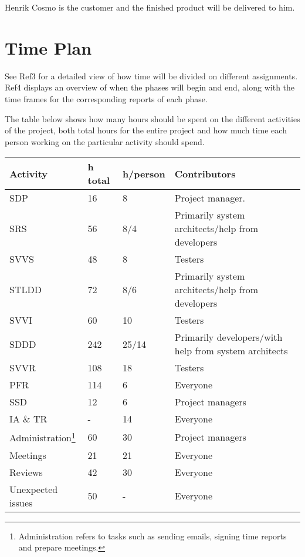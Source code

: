 \documentclass[a4paper]{article}
\begin{document}
Henrik Cosmo is the customer and the finished product will be delivered to him.

\section{Time Plan}
See Ref3 for a detailed view of how time will be divided on different assignments. Ref4 displays an overview of when the phases will begin and end, along with the time frames for the corresponding reports of each phase.

The table below shows how many hours should be spent on the different activities of the project, both total hours for the entire project and how much time each person working on the particular activity should spend.

\begin{center}
    \begin{tabular}{ | l | l | l | p{5cm} |}
    \hline
    \textbf{Activity} & \textbf{h total} & \textbf{h/person} & \textbf{Contributors} \\ \hline
    SDP & 16 & 8 & Project manager. \\ \hline
    SRS & 56 & 8/4 &  Primarily system architects/help from developers\\ \hline
    SVVS & 48 & 8 & Testers\\ \hline
    STLDD & 72 & 8/6 & Primarily system architects/help from developers\\ \hline
    SVVI & 60 & 10 & Testers\\ \hline
    SDDD & 242 & 25/14 & Primarily developers/with help from system architects\\ \hline
    SVVR & 108 & 18 & Testers\\ \hline
    PFR & 114 & 6 & Everyone\\ \hline
    SSD & 12 & 6 & Project managers\\ \hline
    IA \& TR & - & 14 & Everyone \\ \hline
    Administration\footnote{Administration refers to tasks such as sending emails, signing time reports and prepare meetings.} & 60 & 30 & Project managers \\ \hline
    Meetings & 21 & 21 & Everyone \\ \hline
    Reviews & 42 & 30 & Everyone \\ \hline
    Unexpected issues & 50 & - & Everyone \\ \hline
    \end{tabular}
\end{center}
\end{document}
